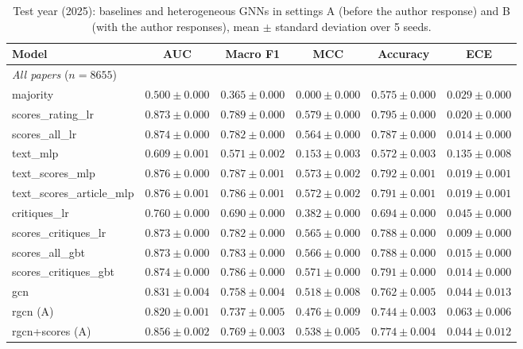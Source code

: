 \begin{table}[t]
\centering
\caption{Test year (2025): baselines and heterogeneous GNNs in settings A (before the author response) and B (with the author responses), mean $\pm$ standard deviation over 5 seeds.}
\label{tab:main-results}
\begin{tabular}{lccccc}
\toprule
Model & AUC & Macro F1 & MCC & Accuracy & ECE \\
\midrule
\multicolumn{6}{l}{\emph{All papers} ($n = 8655$)} \\
majority & $0.500 \pm 0.000$ & $0.365 \pm 0.000$ & $0.000 \pm 0.000$ & $0.575 \pm 0.000$ & $0.029 \pm 0.000$ \\
scores\_rating\_lr & $0.873 \pm 0.000$ & $0.789 \pm 0.000$ & $0.579 \pm 0.000$ & $0.795 \pm 0.000$ & $0.020 \pm 0.000$ \\
scores\_all\_lr & $0.874 \pm 0.000$ & $0.782 \pm 0.000$ & $0.564 \pm 0.000$ & $0.787 \pm 0.000$ & $0.014 \pm 0.000$ \\
text\_mlp & $0.609 \pm 0.001$ & $0.571 \pm 0.002$ & $0.153 \pm 0.003$ & $0.572 \pm 0.003$ & $0.135 \pm 0.008$ \\
text\_scores\_mlp & $0.876 \pm 0.000$ & $0.787 \pm 0.001$ & $0.573 \pm 0.002$ & $0.792 \pm 0.001$ & $0.019 \pm 0.001$ \\
text\_scores\_article\_mlp & $0.876 \pm 0.001$ & $0.786 \pm 0.001$ & $0.572 \pm 0.002$ & $0.791 \pm 0.001$ & $0.019 \pm 0.001$ \\
critiques\_lr & $0.760 \pm 0.000$ & $0.690 \pm 0.000$ & $0.382 \pm 0.000$ & $0.694 \pm 0.000$ & $0.045 \pm 0.000$ \\
scores\_critiques\_lr & $0.873 \pm 0.000$ & $0.782 \pm 0.000$ & $0.565 \pm 0.000$ & $0.788 \pm 0.000$ & $0.009 \pm 0.000$ \\
scores\_all\_gbt & $0.873 \pm 0.000$ & $0.783 \pm 0.000$ & $0.566 \pm 0.000$ & $0.788 \pm 0.000$ & $0.015 \pm 0.000$ \\
scores\_critiques\_gbt & $0.874 \pm 0.000$ & $0.786 \pm 0.000$ & $0.571 \pm 0.000$ & $0.791 \pm 0.000$ & $0.014 \pm 0.000$ \\
gcn & $0.831 \pm 0.004$ & $0.758 \pm 0.004$ & $0.518 \pm 0.008$ & $0.762 \pm 0.005$ & $0.044 \pm 0.013$ \\
rgcn (A) & $0.820 \pm 0.001$ & $0.737 \pm 0.005$ & $0.476 \pm 0.009$ & $0.744 \pm 0.003$ & $0.063 \pm 0.006$ \\
rgcn+scores (A) & $0.856 \pm 0.002$ & $0.769 \pm 0.003$ & $0.538 \pm 0.005$ & $0.774 \pm 0.004$ & $0.044 \pm 0.012$ \\

\end{tabular}
\end{table}
